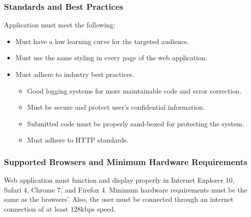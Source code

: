 \label{sec:stand}
\subsubsection{Standards and Best Practices}

Application must meet the following:

\begin{itemize}
\item Must have a low learning curve for the targeted audience.
\item Must use the same styling in every page of the web application.
\item Must adhere to industry best practices.
\begin{itemize}
\item Good logging systems for more maintainable code and error correction.
\item Must be secure and protect user's confidential information.
\item Submitted code must be properly sand-boxed for protecting the system.
\item Must adhere to HTTP standards.
\end{itemize}
\end{itemize}

\subsubsection{Supported Browsers and Minimum Hardware Requirements}

Web application must function and display properly in Internet Explorer 10, 
Safari 4, Chrome 7, and Firefox 4. Minimum hardware requirements must be the same as the browsers'. Also, the user must be connected through an internet connection of at least 128kbps speed.